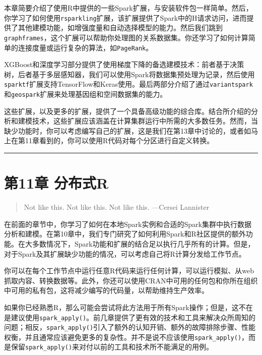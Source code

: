 \documentclass[
]{article}
\begin{document}
本章简要介绍了使用R中提供的一些Spark扩展，与安装软件包一样简单。然后，你学习了如何使用\texttt{rsparkling}扩展，该扩展提供了Spark中的H请求访问，进而提供了其他建模功能，如增强度量和自动选择模型的能力。然后我们跳到\texttt{graphframes}，这个扩展可以帮助你处理图的关系数据集。你还学习了如何计算简单的连接度量或运行复杂的算法，如\texttt{PageRank}。

XGBoost和深度学习部分提供了使用梯度下降的备选建模技术：前者基于决策树，后者基于多层感知器，我们可以使用Spark将数据集预处理为记录，然后使用\texttt{sparktf}扩展支持TensorFlow和Keras使用。最后两部分介绍了通过\texttt{variantspark}和\texttt{geospark}扩展来处理基因组和空间数据集的能力。

这些扩展，以及更多的扩展，提供了一个具备高级功能的综合库。结合所介绍的分析和建模技术，这些扩展应该涵盖在计算集群运行中所需的大多数任务。然而，当缺少功能时，你可以考虑编写自己的扩展，这是我们在第13章中讨论的，或者如马上在第11章看到的，你可以使用R代码对每个分区进行自定义转换。

\begin{center}\rule{0.5\linewidth}{\linethickness}\end{center}

\hypertarget{ux7b2c11ux7ae0-ux5206ux5e03ux5f0fr}{%
\section{第11章 分布式R}\label{ux7b2c11ux7ae0-ux5206ux5e03ux5f0fr}}

\begin{quote}
Not like this. Not like this. Not like this. ---Cersei Lannister
\end{quote}

在前面的章节中，你学习了如何在本地Spark实例和合适的Spark集群中执行数据分析和建模。在第10章中，我们专门研究了如何利用Spark和R社区提供的额外功能。在大多数情况下，Spark功能和扩展的结合足以执行几乎所有的计算。但是，对于Spark及其扩展缺少功能的情况，可以考虑自己将R计算分发给工作节点。

你可以在每个工作节点中运行任意R代码来运行任何计算，可以运行模拟、从web抓取内容、转换数据等。此外，你还可以使用CRAN中可用的任何包和你所在组织中可用的私有包，这将减少编写的代码量，以帮助维持生产效率。

如果你已经熟悉R，那么可能会尝试将此方法用于所有Spark操作；但是，这不在是建议使用\texttt{spark\_apply()}。前几章提供了更有效的技术和工具来解决众所周知的问题；相反，\texttt{spark\_apply()}引入了额外的认知开销、额外的故障排除步骤、性能权衡，并且通常应该避免更多的复杂性。并不是说不应该使用\texttt{spark\_apply()}，而是保留\texttt{spark\_apply()}来对付以前的工具和技术所不能满足的用例。
\end{document}
